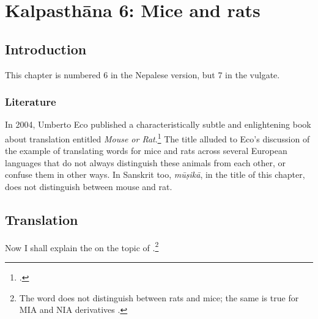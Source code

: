 \chapter{Kalpasthāna 6: Mice and rats}
\label{mūṣikā}


\section{Introduction}

This chapter is numbered 6 in the Nepalese version, but 7 in the vulgate.

\subsection{Literature}

In 2004, Umberto Eco published a characteristically subtle and enlightening 
book about translation entitled \emph{Mouse or Rat}.\footcite{eco-2004} 
The title alluded to Eco's discussion of the example of translating words for 
mice and rats across several European languages that do not always 
distinguish these animals from each other, or confuse them in other ways.  In 
Sanskrit too, \emph{mūṣikā}, in the title of this chapter, does not distinguish 
between mouse and rat.  




\section{Translation}

\begin{translation}
    
    \item[1] 
    
Now I shall explain the  on the topic of
.\footnote{The word  does not distinguish 
between rats and mice; the same is true for MIA and NIA derivatives
\cite[\#10258]{CDIAL}.}
    
    \item[3] 
    
    
    \end{translation}
